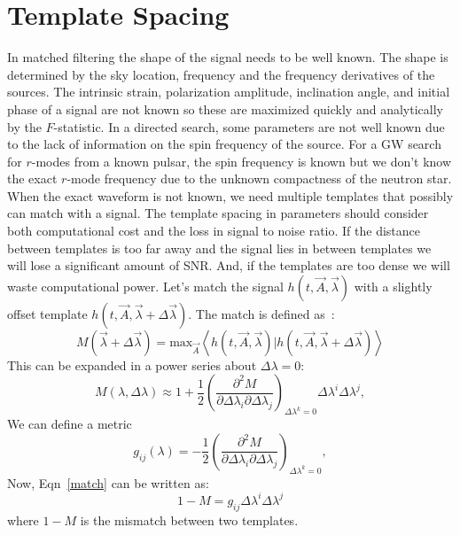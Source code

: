 \documentclass{ttuthes2007}
\begin{document}
\section{Template Spacing}
In matched filtering the shape of the signal needs to be well known. The shape
is
determined by the sky location, frequency and the frequency derivatives of the
sources. The intrinsic strain, polarization amplitude, inclination angle, and
initial phase of a signal are not known so these are maximized quickly and
analytically by the $F$-statistic. In a
directed search, some parameters are not well known due to the lack of
information on the spin frequency of the source. For a \ac{GW} search for
$r$-modes
from a known pulsar, the spin frequency is known but we don't know the exact
$r$-mode frequency due to the unknown compactness of the neutron star. When the
exact waveform is not known, we need multiple templates that possibly can
match with a signal. The template spacing in parameters should consider both computational
cost and the loss in signal to noise ratio. If the distance between templates is
too far away
and the signal lies in between templates we will lose a significant amount of
\ac{SNR}. And, if the templates are too dense we will waste computational
power.  Let's match the signal $h(t,\vec{A},\vec{\lambda})$ with a slightly offset template
 $h(t,\vec{A},\vec{\lambda}+\Delta\vec{\lambda})$. The match is defined
as~\cite{Owen_1996}:
\begin{equation}
M(\vec{\lambda}+\Delta\vec{\lambda}) =
\mathrm{max}_{\vec{A}}\left\langle h(t,\vec{A},\vec{\lambda})|h(t,\vec{A},\vec{\lambda}+\Delta\vec{\lambda})\right\rangle
\end{equation}
This can be expanded in a power series about $\Delta\lambda=0$:
\begin{equation}\label{match}
M(\lambda,\Delta\lambda)\approx
1+\frac{1}{2}\left(\frac{\partial^2M}{\partial\Delta\lambda_i\partial\Delta\lambda_j}\right)_{\Delta\lambda^k=0}
\Delta\lambda^i\Delta\lambda^j,
\end{equation}
We can define a metric 
\begin{equation}
g_{ij}(\lambda)=-\frac{1}{2}\left(\frac{\partial^2M}{\partial\Delta\lambda_i\partial\Delta\lambda_j}\right)_{\Delta\lambda^k=0},
\end{equation}
Now, Eqn~\ref{match} can be written as:
\begin{equation}
1-M=g_{ij} \Delta\lambda^i\Delta\lambda^j
\end{equation}
where $1-M$ is the mismatch between two templates.
\end{document}
